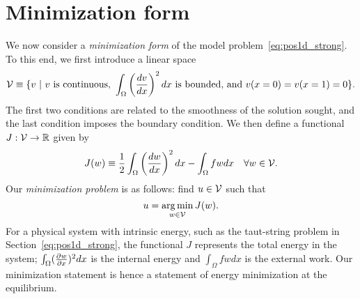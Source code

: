 \section{Minimization form}
We now consider a \emph{minimization form} of the model problem~\eqref{eq:pos1d_strong}.  To this end, we first introduce a linear space
\begin{equation}
  \calV \equiv \{ v \ | \
   v \text{ is continuous, } 
   \int_\Omega \left(\dd{v}{x}\right)^2 dx \text{ is bounded, and } %
   v(x=0) = v(x=1) = 0 \}.
  \label{eq:pos1d_V}
\end{equation}
The first two conditions are related to the smoothness of the solution sought, and the last condition imposes the boundary condition.
We then define a functional $J: \mathcal{V} \to \mathbb{R}$ given by
\begin{equation}
  J(w) \equiv \frac{1}{2} \int_\Omega \left( \frac{d w}{d x} \right)^2 dx - \int_\Omega f w dx \quad \forall w \in \mathcal{V}.
  \label{eq:pos1d_J}
\end{equation}
Our \emph{minimization problem} is as follows: find $u \in \mathcal{V}$ such that
\begin{equation}
  u = \operatorname*{arg\,min}_{w \in \mathcal{V}} J(w).
  \label{eq:pos1d_min}
\end{equation}
For a physical system with intrinsic energy, such as the taut-string problem in Section~\ref{eq:pos1d_strong}, the functional $J$ represents the total energy in the system; $\int_\Omega (\frac{\partial w}{\partial x})^2 dx$ is the internal energy and $\int_\Omega f w dx$ is the external work.  Our minimization statement is hence a statement of energy minimization at the equilibrium. 

